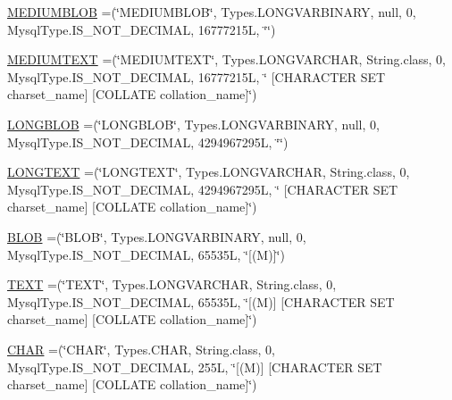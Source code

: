 \begin{DoxyCompactItemize}
\item 
\mbox{\hyperlink{enumcom_1_1mysql_1_1cj_1_1_mysql_type_a7a690573bfaf820db73489978040f19d}{M\+E\+D\+I\+U\+M\+B\+L\+OB}} =(\char`\"{}M\+E\+D\+I\+U\+M\+B\+L\+OB\char`\"{}, Types.\+L\+O\+N\+G\+V\+A\+R\+B\+I\+N\+A\+RY, null, 0, Mysql\+Type.\+I\+S\+\_\+\+N\+O\+T\+\_\+\+D\+E\+C\+I\+M\+AL, 16777215\+L, \char`\"{}\char`\"{})
\item 
\mbox{\hyperlink{enumcom_1_1mysql_1_1cj_1_1_mysql_type_a8152d42c2961d0e081e76dbbadd7b4f2}{M\+E\+D\+I\+U\+M\+T\+E\+XT}} =(\char`\"{}M\+E\+D\+I\+U\+M\+T\+E\+XT\char`\"{}, Types.\+L\+O\+N\+G\+V\+A\+R\+C\+H\+AR, String.\+class, 0, Mysql\+Type.\+I\+S\+\_\+\+N\+O\+T\+\_\+\+D\+E\+C\+I\+M\+AL, 16777215\+L, \char`\"{} \mbox{[}\+C\+H\+A\+R\+A\+C\+T\+E\+R S\+E\+T charset\+\_\+name\mbox{]} \mbox{[}\+C\+O\+L\+L\+A\+T\+E collation\+\_\+name\mbox{]}\char`\"{})
\item 
\mbox{\hyperlink{enumcom_1_1mysql_1_1cj_1_1_mysql_type_ae25524b95c3afb1577b4e86a9b1f9fca}{L\+O\+N\+G\+B\+L\+OB}} =(\char`\"{}L\+O\+N\+G\+B\+L\+OB\char`\"{}, Types.\+L\+O\+N\+G\+V\+A\+R\+B\+I\+N\+A\+RY, null, 0, Mysql\+Type.\+I\+S\+\_\+\+N\+O\+T\+\_\+\+D\+E\+C\+I\+M\+AL, 4294967295\+L, \char`\"{}\char`\"{})
\item 
\mbox{\hyperlink{enumcom_1_1mysql_1_1cj_1_1_mysql_type_a2c64c15b3f4f30e58cf638130fa67a07}{L\+O\+N\+G\+T\+E\+XT}} =(\char`\"{}L\+O\+N\+G\+T\+E\+XT\char`\"{}, Types.\+L\+O\+N\+G\+V\+A\+R\+C\+H\+AR, String.\+class, 0, Mysql\+Type.\+I\+S\+\_\+\+N\+O\+T\+\_\+\+D\+E\+C\+I\+M\+AL, 4294967295\+L, \char`\"{} \mbox{[}\+C\+H\+A\+R\+A\+C\+T\+E\+R S\+E\+T charset\+\_\+name\mbox{]} \mbox{[}\+C\+O\+L\+L\+A\+T\+E collation\+\_\+name\mbox{]}\char`\"{})
\item 
\mbox{\hyperlink{enumcom_1_1mysql_1_1cj_1_1_mysql_type_ab5c20c6e73cfab558b68240c5087aa47}{B\+L\+OB}} =(\char`\"{}B\+L\+OB\char`\"{}, Types.\+L\+O\+N\+G\+V\+A\+R\+B\+I\+N\+A\+RY, null, 0, Mysql\+Type.\+I\+S\+\_\+\+N\+O\+T\+\_\+\+D\+E\+C\+I\+M\+AL, 65535\+L, \char`\"{}\mbox{[}(\+M)\mbox{]}\char`\"{})
\item 
\mbox{\hyperlink{enumcom_1_1mysql_1_1cj_1_1_mysql_type_af97147cd8d895153093d3ba21bf44007}{T\+E\+XT}} =(\char`\"{}T\+E\+XT\char`\"{}, Types.\+L\+O\+N\+G\+V\+A\+R\+C\+H\+AR, String.\+class, 0, Mysql\+Type.\+I\+S\+\_\+\+N\+O\+T\+\_\+\+D\+E\+C\+I\+M\+AL, 65535\+L, \char`\"{}\mbox{[}(\+M)\mbox{]} \mbox{[}\+C\+H\+A\+R\+A\+C\+T\+E\+R S\+E\+T charset\+\_\+name\mbox{]} \mbox{[}\+C\+O\+L\+L\+A\+T\+E collation\+\_\+name\mbox{]}\char`\"{})
\item 
\mbox{\hyperlink{enumcom_1_1mysql_1_1cj_1_1_mysql_type_a7bcb1882ce4e4d44421d877d3f1f64a9}{C\+H\+AR}} =(\char`\"{}C\+H\+AR\char`\"{}, Types.\+C\+H\+AR, String.\+class, 0, Mysql\+Type.\+I\+S\+\_\+\+N\+O\+T\+\_\+\+D\+E\+C\+I\+M\+AL, 255\+L, \char`\"{}\mbox{[}(\+M)\mbox{]} \mbox{[}\+C\+H\+A\+R\+A\+C\+T\+E\+R S\+E\+T charset\+\_\+name\mbox{]} \mbox{[}\+C\+O\+L\+L\+A\+T\+E collation\+\_\+name\mbox{]}\char`\"{})

\end{DoxyCompactItemize}
